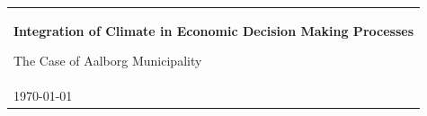 
%
\begin{titlepage}
\vspace*{\fill}
  \addtolength{\hoffset}{0.5\evensidemargin-0.5\oddsidemargin}
  \noindent%
  {\color{white}\colorbox{aaublue}{\begin{tabular}{@{}p{\textwidth}@{}}
    \begin{center}
    \Huge{\textbf{
       Integration of Climate in Economic Decision Making Processes
    }}
    \end{center}
    \begin{center}
      \Large{
       The Case of Aalborg Municipality
      }
    \end{center}
    \vspace{0.2cm}
   \begin{center}
    {\Large
      Emma Pedersen
    }\\
    \vspace{0.2cm}
    {\large
      \today
    }
   \end{center}
   \vspace{0.2cm}


\end{tabular}}}
\end{titlepage}
